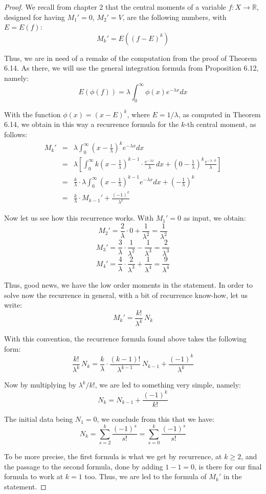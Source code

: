 \documentclass[12pt]{amsbook}
\begin{document}
\begin{proof}
We recall from chapter 2 that the central moments of a variable $f:X\to\mathbb R$, designed for having $M_1'=0$, $M_2'=V$, are the following numbers, with $E=E(f)$:
$$M_k'=E((f-E)^k)$$

Thus, we are in need of a remake of the computation from the proof of Theorem 6.14. As there, we will use the general integration formula from Proposition 6.12, namely:
$$E(\phi(f))=\lambda\int_0^\infty\phi(x)e^{-\lambda x}dx$$

With the function $\phi(x)=(x-E)^k$, where $E=1/\lambda$, as computed in Theorem 6.14, we obtain in this way a recurrence formula for the $k$-th central moment, as follows:
\begin{eqnarray*}
M_k'
&=&\lambda\int_0^\infty\left(x-\frac{1}{\lambda}\right)^ke^{-\lambda x}dx\\
&=&\lambda\left[\int_0^\infty k\left(x-\frac{1}{\lambda}\right)^{k-1}\cdot\frac{e^{-\lambda x}}{\lambda}\,dx+\left(0-\frac{1}{\lambda}\right)^k\frac{e^{-\lambda\cdot0}}{\lambda}\right]\\
&=&\frac{k}{\lambda}\cdot\lambda\int_0^\infty\left(x-\frac{1}{\lambda}\right)^{k-1}e^{-\lambda x}dx+\left(-\frac{1}{\lambda}\right)^k\\
&=&\frac{k}{\lambda}\cdot M_{k-1}'+\frac{(-1)^k}{\lambda^k}
\end{eqnarray*}

Now let us see how this recurrence works. With $M_1'=0$ as input, we obtain:
$$M_2'=\frac{2}{\lambda}\cdot0+\frac{1}{\lambda^2}=\frac{1}{\lambda^2}$$
$$M_3'=\frac{3}{\lambda}\cdot\frac{1}{\lambda^2}-\frac{1}{\lambda^3}=\frac{2}{\lambda^3}$$
$$M_4'=\frac{4}{\lambda}\cdot\frac{2}{\lambda^3}+\frac{1}{\lambda^4}=\frac{9}{\lambda^4}$$

Thus, good news, we have the low order moments in the statement. In order to solve now the recurrence in general, with a bit of recurrence know-how, let us write:
$$M_k'=\frac{k!}{\lambda^k}\,N_k$$

With this convention, the recurrence formula found above takes the following form:
$$\frac{k!}{\lambda^k}\,N_k=\frac{k}{\lambda}\cdot\frac{(k-1)!}{\lambda^{k-1}}\,N_{k-1}+\frac{(-1)^k}{\lambda^k}$$

Now by multiplying by $\lambda^k/k!$, we are led to something very simple, namely:
$$N_k=N_{k-1}+\frac{(-1)^k}{k!}$$

The initial data being $N_1=0$, we conclude from this that we have:
$$N_k=\sum_{s=2}^k\frac{(-1)^s}{s!}=\sum_{s=0}^k\frac{(-1)^s}{s!}$$

To be more precise, the first formula is what we get by recurrence, at $k\geq2$, and the passage to the second formula, done by adding $1-1=0$, is there for our final formula to work at $k=1$ too. Thus, we are led to the formula of $M_k'$ in the statement.
\end{proof}
\end{document}

